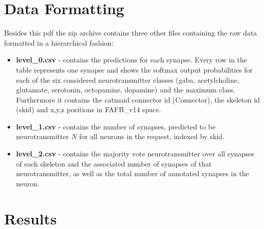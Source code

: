 \documentclass[a4paper,10pt]{article}
\begin{document}
   \section{Data Formatting}
   Besides this pdf the zip archive contains three other files containing the raw data formatted in a hierarchical fashion:
   \begin{itemize}
       \item \textbf{level\_0.csv} - contains the predictions for each synapse. Every row in the table represents one synapse and shows the softmax output probabilities for each of the six considered neurotransmitter classes (gaba, acetylcholine, glutamate, serotonin, octopamine, dopamine) and the maximum class. Furthermore it contains the catmaid connector id (Connector), the skeleton id (skid) and x,y,z positions in FAFB\_v14 space.
       \item \textbf{level\_1.csv} - contains the number of synapses, predicted to be neurotransmitter $N$ for all neurons in the request, indexed by skid.
       \item \textbf{level\_2.csv} - contains the majority vote neurotransmitter over all synapses of each skeleton and the associated number of synapses of that neurotransmitter, as well as the total number of annotated synapses in the neuron. 
   \end{itemize}
   \section{Results}
    \centering
   
\end{document}
